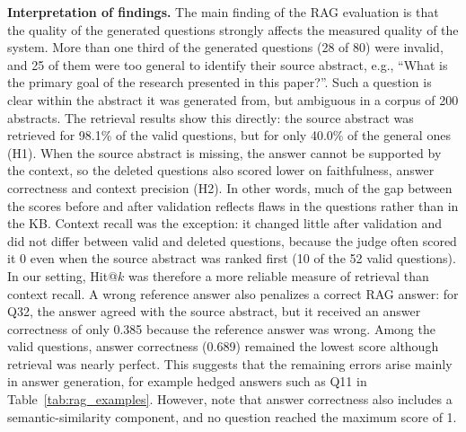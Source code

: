 \documentclass[bdcc,article,submit,pdftex,moreauthors]{Definitions/mdpi}
\newcommand{\commentRed}[1]{\textcolor{red}{#1}}
\newcommand{\commentVP}[1]{\textcolor{orange}{\textbf{VP:} #1}}
\begin{document}


\textbf{Interpretation of findings.} The main finding of the RAG evaluation is that the quality of the generated questions strongly affects the measured quality of the system. More than one third of the generated questions (28 of 80) were invalid, and 25 of them were too general to identify their source abstract, e.g., ``What is the primary goal of the research presented in this paper?''. Such a question is clear within the abstract it was generated from, but ambiguous in a corpus of 200 abstracts. The retrieval results show this directly: the source abstract was retrieved for 98.1\% of the valid questions, but for only 40.0\% of the general ones (H1). When the source abstract is missing, the answer cannot be supported by the context, so the deleted questions also scored lower on faithfulness, answer correctness and context precision (H2). In other words, much of the gap between the scores before and after validation reflects flaws in the questions rather than in the KB. Context recall was the exception: it changed little after validation and did not differ between valid and deleted questions, because the judge often scored it 0 even when the source abstract was ranked first (10 of the 52 valid questions). In our setting, Hit@$k$ was therefore a more reliable measure of retrieval than context recall. A wrong reference answer also penalizes a correct RAG answer: for Q32, the answer agreed with the source abstract, but it received an answer correctness of only 0.385 because the reference answer was wrong. Among the valid questions, answer correctness (0.689) remained the lowest score although retrieval was nearly perfect. This suggests that the remaining errors arise mainly in answer generation, for example hedged answers such as Q11 in Table~\ref{tab:rag_examples}. However, note that answer correctness also includes a semantic-similarity component, and no question reached the maximum score of 1.
\end{document}
